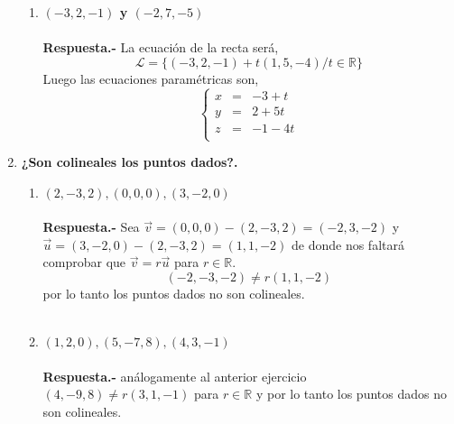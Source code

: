 \begin{enumerate}
\begin{enumerate}[\bfseries a)]
	    \item \textbf{\boldmath $(-3,2,-1)$ y $(-2,7,-5)$\\\\
		Respuesta.-}\; La ecuación de la recta será,
		$$\mathcal{L} = \lbrace (-3,2,-1) + t(1,5,-4) / t\in \mathbb{R} \rbrace$$
		Luego las ecuaciones paramétricas son, 
		$$\left\{\begin{array}{rcr}
		    x&=&-3+t\\
		    y&=&2+5t\\
		    z&=&-1-4t\\
		\end{array}\right.$$
		\vspace{0.5cm}

	\end{enumerate}

    \item \textbf{¿Son colineales los puntos dados?.}\\
	\begin{enumerate}[\bfseries a)]
	    
	    \item \textbf{\boldmath $(2,-3,2),(0,0,0),(3,-2,0)$\\\\
		Respuesta.-}\; Sea $\vec{v}=(0,0,0)-(2,-3,2)=(-2,3,-2)$ y $\vec{u}=(3,-2,0)-(2,-3,2)=(1,1,-2)$ de donde nos faltará comprobar que $\vec{v}=r\vec{u}$ para $r\in \mathbb{R}$.
		$$(-2,-3,-2)\neq r(1,1,-2)$$
		por lo tanto los puntos dados no son colineales.\\\\

	    \item \textbf{\boldmath $(1,2,0),(5,-7,8),(4,3,-1)$\\\\
		Respuesta.-}\; análogamente al anterior ejercicio $(4,-9,8)\neq r(3,1,-1)$ para $r\in \mathbb{R}$ y por lo tanto los puntos dados no son colineales.\\\\

	\end{enumerate}


\end{enumerate}
